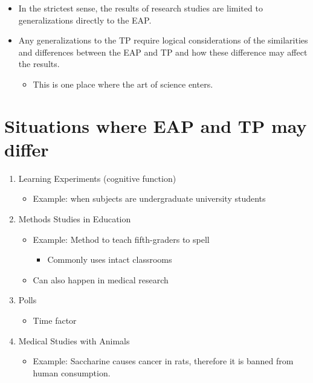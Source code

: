 \documentclass[12pt]{article}
\begin{document}
\begin{itemize}
\itemsep1pt\parskip0pt
\item
  In the strictest sense, the results of research studies are limited to
  generalizations directly to the EAP.
\item
  Any generalizations to the TP require logical considerations of the
  similarities and differences between the EAP and TP and how these
  difference may affect the results.

  \begin{itemize}
  \itemsep1pt\parskip0pt
  \item
    This is one place where the art of science enters.
  \end{itemize}
\end{itemize}

\section{Situations where EAP and TP may
differ}\label{situations-where-eap-and-tp-may-differ}

\begin{enumerate}
\def\labelenumi{\arabic{enumi}.}
\itemsep1pt\parskip0pt
\item
  Learning Experiments (cognitive function)

  \begin{itemize}
  \itemsep1pt\parskip0pt
  \item
    Example: when subjects are undergraduate university students
  \end{itemize}
\item
  Methods Studies in Education

  \begin{itemize}
  \itemsep1pt\parskip0pt
  \item
    Example: Method to teach fifth-graders to spell

    \begin{itemize}
    \itemsep1pt\parskip0pt
    \item
      Commonly uses intact classrooms
    \end{itemize}
  \item
    Can also happen in medical research
  \end{itemize}
\item
  Polls

  \begin{itemize}
  \itemsep1pt\parskip0pt
  \item
    Time factor
  \end{itemize}
\item
  Medical Studies with Animals

  \begin{itemize}
  \itemsep1pt\parskip0pt
  \item
    Example: Saccharine causes cancer in rats, therefore it is banned
    from human consumption.
  \end{itemize}
\end{enumerate}
\end{document}

